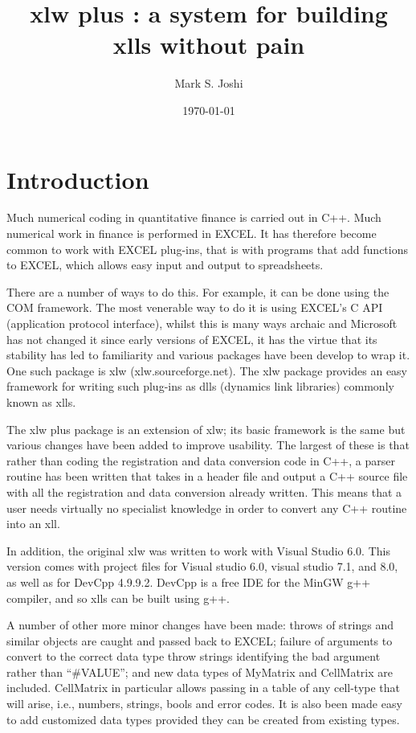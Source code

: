 \documentclass[12pt,reqno]{amsart}
\title[xlw plus]{
xlw plus : a system for building xlls without pain
}
\author{Mark S. Joshi}
\date {\today}
\numberwithin{equation}{section}
\numberwithin{figure}{section}
\begin{document}
\maketitle
\section{Introduction}
Much numerical coding in quantitative finance is carried out in
C++. Much numerical work in finance is performed in EXCEL. It has
therefore become common to work with EXCEL plug-ins, that is with
programs that add functions to EXCEL, which allows easy input and output
to spreadsheets.

There are a number of ways to do this. For example, it can be done
using the COM framework. The most venerable way to do it is using
EXCEL's C API (application protocol interface), whilst this is many
ways archaic and Microsoft has not changed it since early versions of
EXCEL, it has the virtue that its stability has led to familiarity and
various packages have been develop to wrap it. One such package is xlw
(xlw.sourceforge.net). The xlw package provides an easy framework for
writing such plug-ins as dlls (dynamics link libraries) commonly known
as xlls. 

The xlw plus package is an extension of xlw; its basic framework is
the same but various changes have been added to improve usability. The
largest of these is that rather than coding the registration and data
conversion code in
C++, a parser routine has been written that takes in a header file and
output a C++ source file with all the registration and data conversion
already written. This means that a user needs virtually no specialist
knowledge in order to convert any C++ routine into an xll. 

In addition, the original xlw was written to work with Visual Studio
6.0. This version comes with project files for Visual studio 6.0, visual studio 7.1, and
8.0, as well as for DevCpp 4.9.9.2. DevCpp is a free IDE for the MinGW
g++ compiler, and so xlls can be built using g++. 

A number of other more minor changes have been made: throws of strings and
similar objects are caught and passed back to EXCEL; failure of
arguments to convert to the correct data type throw strings
identifying the bad argument rather than ``\#VALUE''; and new data
types of MyMatrix and CellMatrix are included. CellMatrix in
particular allows passing in a table of any cell-type that will arise,
i.e., numbers, strings, bools and error codes. It is also been made
easy to add customized data types provided they can be created from
existing types. 
\end{document}
